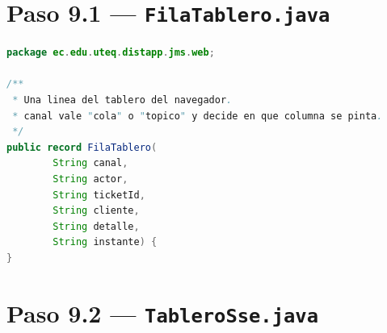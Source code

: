 \documentclass[11pt,a4paper]{book}
\newcommand{\ruta}[1]{\texttt{#1}}
\begin{document}
\section{Paso 9.1 --- \texttt{FilaTablero.java}}

\begin{lstlisting}[language=Java,caption={\ruta{web/FilaTablero.java}},label={lst:cfila}]
package ec.edu.uteq.distapp.jms.web;

/**
 * Una linea del tablero del navegador.
 * canal vale "cola" o "topico" y decide en que columna se pinta.
 */
public record FilaTablero(
		String canal,
		String actor,
		String ticketId,
		String cliente,
		String detalle,
		String instante) {
}
\end{lstlisting}

\section{Paso 9.2 --- \texttt{TableroSse.java}}
\end{document}
